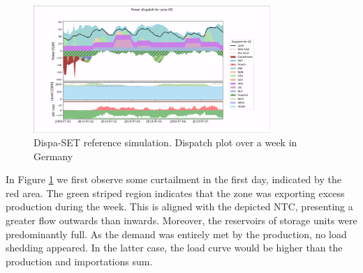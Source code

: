 \begin{figure}[h]
    \centering
    \includegraphics[width=0.8\textwidth]{resources/images/dispatch-DE-week.png}
    \caption{Dispa-SET reference simulation. Dispatch plot over a week in Germany}
    \label{fig:dispatch-de-week}
\end{figure}

In Figure \ref{fig:dispatch-de-week} we first observe some curtailment in the first day, indicated by the red area. The green striped region indicates that the zone was exporting excess production during the week. This is aligned with the depicted NTC, presenting a greater flow outwards than inwards. Moreover, the reservoirs of storage units were predominantly full. As the demand was entirely met by the production, no load shedding appeared. In the latter case, the load curve would be higher than the production and importations sum.